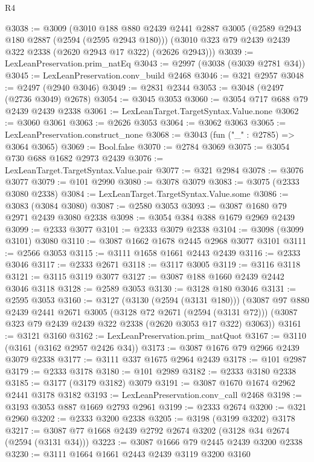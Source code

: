 \begin{lexlean}{R4}
\begin{coremodule}
@3038 := @3009
    (@3010
      @188
      @880
      @2439
      @2441
      @2887
      @3005
      (@2589 @2943 @180 @2887 (@2594 (@2595 @2943 @180)))
      (@3010 @323 @79 @2439 @2439 @322 @2338 (@2620 @2943 @17 @322) (@2626 @2943)))
@3039 := LexLeanPreservation.prim_natEq
@3043 := @2997 (@3038 (@3039 @2781 @34))
@3045 := LexLeanPreservation.conv_build @2468
@3046 := @321 @2957
@3048 := @2497 (@2940 @3046)
@3049 := @2831 @2344
@3053 := @3048 (@2497 (@2736 @3049) @2678)
@3054 := @3045 @3053
@3060 := @3054 @717 @688 @79 @2439 @2439 @2338
@3061 := LexLeanTarget.TargetSyntax.Value.none
@3062 := @3060 @3061
@3063 := @2626 @3053
@3064 := @3062 @3063
@3065 := LexLeanPreservation.construct_none
@3068 := @3043 (fun ("_" : @2785) => @3064 @3065)
@3069 := Bool.false
@3070 := @2784 @3069
@3075 := @3054 @730 @688 @1682 @2973 @2439
@3076 := LexLeanTarget.TargetSyntax.Value.pair
@3077 := @321 @2984
@3078 := @3076 @3077
@3079 := @101 @2990
@3080 := @3078 @3079
@3083 := @3075 (@2333 @3080 @2338)
@3084 := LexLeanTarget.TargetSyntax.Value.some
@3086 := @3083 (@3084 @3080)
@3087 := @2580 @3053
@3093 := @3087 @1680 @79 @2971 @2439 @3080 @2338
@3098 := @3054 @384 @388 @1679 @2969 @2439
@3099 := @2333 @3077
@3101 := @2333 @3079 @2338
@3104 := @3098 (@3099 @3101) @3080
@3110 := @3087 @1662 @1678 @2445 @2968 @3077 @3101
@3111 := @2566 @3053
@3115 := @3111 @1658 @1661 @2443 @2439
@3116 := @2333 @3046
@3117 := @2333 @2671
@3118 := @3117 @3005
@3119 := @3116 @3118
@3121 := @3115 @3119 @3077
@3127 := @3087 @188 @1660 @2439 @2442 @3046 @3118
@3128 := @2589 @3053
@3130 := @3128 @180 @3046
@3131 := @2595 @3053
@3160 := @3127
    (@3130 (@2594 (@3131 @180)))
    (@3087
      @97
      @880
      @2439
      @2441
      @2671
      @3005
      (@3128 @72 @2671 (@2594 (@3131 @72)))
      (@3087 @323 @79 @2439 @2439 @322 @2338 (@2620 @3053 @17 @322) @3063))
@3161 := @3121 @3160
@3162 := LexLeanPreservation.prim_natQuot
@3167 := @3110 (@3161 (@3162 @2957 @2426 @34))
@3173 := @3087 @1676 @79 @2966 @2439 @3079 @2338
@3177 := @3111 @337 @1675 @2964 @2439
@3178 := @101 @2987
@3179 := @2333 @3178
@3180 := @101 @2989
@3182 := @2333 @3180 @2338
@3185 := @3177 (@3179 @3182) @3079
@3191 := @3087 @1670 @1674 @2962 @2441 @3178 @3182
@3193 := LexLeanPreservation.conv_call @2468
@3198 := @3193 @3053 @887 @1669 @2793 @2961
@3199 := @2333 @2674
@3200 := @321 @2960
@3202 := @2333 @3200 @2338
@3205 := @3198 (@3199 @3202) @3178
@3217 := @3087 @77 @1668 @2439 @2792 @2674 @3202 (@3128 @34 @2674 (@2594 (@3131 @34)))
@3223 := @3087 @1666 @79 @2445 @2439 @3200 @2338
@3230 := @3111 @1664 @1661 @2443 @2439 @3119 @3200 @3160

\end{coremodule}
\end{lexlean}
